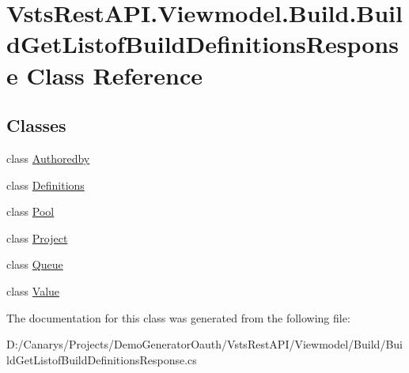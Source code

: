 \hypertarget{class_vsts_rest_a_p_i_1_1_viewmodel_1_1_build_1_1_build_get_listof_build_definitions_response}{}\section{Vsts\+Rest\+A\+P\+I.\+Viewmodel.\+Build.\+Build\+Get\+Listof\+Build\+Definitions\+Response Class Reference}
\label{class_vsts_rest_a_p_i_1_1_viewmodel_1_1_build_1_1_build_get_listof_build_definitions_response}
\subsection*{Classes}
\begin{DoxyCompactItemize}
\item 
class \mbox{\hyperlink{class_vsts_rest_a_p_i_1_1_viewmodel_1_1_build_1_1_build_get_listof_build_definitions_response_1_1_authoredby}{Authoredby}}
\item 
class \mbox{\hyperlink{class_vsts_rest_a_p_i_1_1_viewmodel_1_1_build_1_1_build_get_listof_build_definitions_response_1_1_definitions}{Definitions}}
\item 
class \mbox{\hyperlink{class_vsts_rest_a_p_i_1_1_viewmodel_1_1_build_1_1_build_get_listof_build_definitions_response_1_1_pool}{Pool}}
\item 
class \mbox{\hyperlink{class_vsts_rest_a_p_i_1_1_viewmodel_1_1_build_1_1_build_get_listof_build_definitions_response_1_1_project}{Project}}
\item 
class \mbox{\hyperlink{class_vsts_rest_a_p_i_1_1_viewmodel_1_1_build_1_1_build_get_listof_build_definitions_response_1_1_queue}{Queue}}
\item 
class \mbox{\hyperlink{class_vsts_rest_a_p_i_1_1_viewmodel_1_1_build_1_1_build_get_listof_build_definitions_response_1_1_value}{Value}}
\end{DoxyCompactItemize}


The documentation for this class was generated from the following file\+:\begin{DoxyCompactItemize}
\item 
D\+:/\+Canarys/\+Projects/\+Demo\+Generator\+Oauth/\+Vsts\+Rest\+A\+P\+I/\+Viewmodel/\+Build/Build\+Get\+Listof\+Build\+Definitions\+Response.\+cs\end{DoxyCompactItemize}
